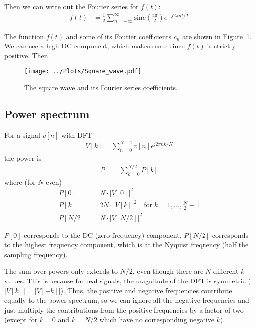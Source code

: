 \documentclass[twocolumn]{myarticle}
\newcommand{\sinc}{\text{sinc}}
\begin{document}
Then we can write out the Fourier series for $ f(t) $:
\begin{align}
    f(t) &= \frac{1}{2} \sum_{n = -\infty}^{\infty} \sinc \left( \frac{n \pi}{2} \right) e^{- j 2 \pi n t / T}
\end{align}

The function $ f(t) $ and some of its Fourier coefficients $ c_n $ are shown in Figure~\ref{fig:square_wave}.
We can see a high DC component, which makes sense since $ f(t) $ is strictly positive.
Then 


\begin{figure}[ht]
    \centering
    \texttt{[image: ../Plots/Square\_wave.pdf]}
    \caption{The square wave and its Fourier series coefficients.}
    \label{fig:square_wave}
\end{figure}

\subsection{Power spectrum}
\label{subsec:power_spectrum}

For a signal $ v[n] $ with DFT 
\begin{align}
    V[k] = \sum_{n = 0}^{N-1} v[n] e^{j 2 \pi n k / N}
\end{align}
the power is
\begin{align}
    P &= \sum_{k=0}^{N/2} P[k]
\end{align}
where (for $ N $ even)
\begin{align}
    P[0] &=   N \cdot \big| V[0]   \big|^2
    \\
    P[k] &= 2 N \cdot \big| V[k]   \big|^2 \quad \text{for } k = 1, \ldots, \frac{N}{2} - 1
    \\
    P[N/2] &= N \cdot \big| V[N/2] \big|^2 
\end{align}

$ P[0] $ corresponds to the DC (zero frequency) component.
$ P[N/2] $ corresponds to the highest frequency component, which is at the Nyquist frequency (half the sampling frequency).

The sum over powers only extends to $ N/2 $, even though there are $ N $ different $ k $ values.
This is because for real signals, the magnitude of the DFT is symmetric ($ |V[k]| = |V[-k]| $).
Thus, the positive and negative frequencies contribute equally to the power spectrum, so we can ignore all the negative frequencies and just multiply the contributions from the positive frequencies by a factor of two (except for $ k = 0 $ and $ k = N/2 $ which have no corresponding negative $ k $).
\end{document}
